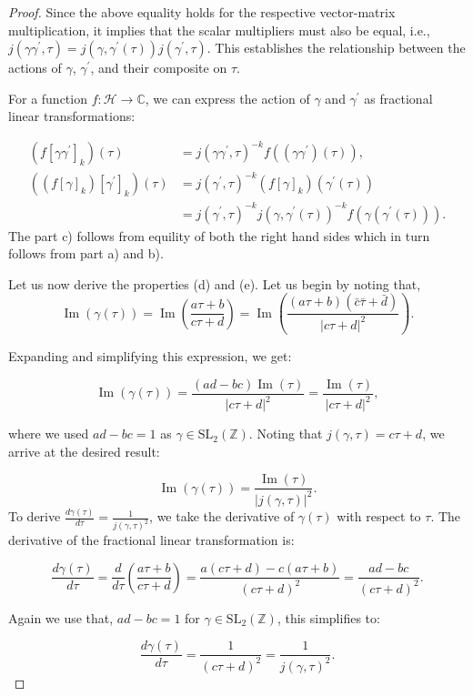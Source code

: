 \begin{proposition}
\begin{proof}
Since the above equality holds for the respective vector-matrix multiplication, it implies that the scalar multipliers must also be equal, i.e., \( j(\gamma \gamma^{\prime}, \tau) = j(\gamma, \gamma^{\prime}(\tau)) j(\gamma^{\prime}, \tau) \). This establishes the relationship between the actions of \( \gamma \), \( \gamma^{\prime} \), and their composite on \( \tau \).

For a function \( f: \mathcal{H} \rightarrow \mathbb{C} \), we can express the action of \( \gamma \) and \( \gamma^{\prime} \) as fractional linear transformations:

\[
\begin{aligned}
\left(f\left[\gamma \gamma^{\prime}\right]_{k}\right)(\tau) &= j(\gamma \gamma^{\prime}, \tau)^{-k} f\left((\gamma \gamma^{\prime})(\tau)\right), \\
\left(\left(f[\gamma]_{k}\right)\left[\gamma^{\prime}\right]_{k}\right)(\tau) &= j(\gamma^{\prime}, \tau)^{-k}\left(f[\gamma]_{k}\right)(\gamma^{\prime}(\tau)) \\
&= j(\gamma^{\prime}, \tau)^{-k} j(\gamma, \gamma^{\prime}(\tau))^{-k} f(\gamma(\gamma^{\prime}(\tau))).
\end{aligned}
\] The part c) follows from equility of both the right hand sides which in turn follows from part a) and b).

Let us now derive the properties (d) and (e).
Let us begin by noting that,
\[
\operatorname{Im}(\gamma(\tau)) = \operatorname{Im}\left(\frac{a\tau + b}{c\tau + d}\right) = \operatorname{Im}\left(\frac{(a\tau + b)(\bar{c}\bar{\tau} + \bar{d})}{|c\tau + d|^2}\right).
\]

Expanding and simplifying this expression, we get:

\[
\operatorname{Im}(\gamma(\tau)) = \frac{(ad - bc)\operatorname{Im}(\tau)}{|c\tau + d|^2} = \frac{\operatorname{Im}(\tau)}{|c\tau + d|^2},
\]

where we used \( ad - bc = 1 \) as \( \gamma \in \mathrm{SL}_{2}(\mathbb{Z}) \). Noting that \( j(\gamma, \tau) = c\tau + d \), we arrive at the desired result:

\[
\operatorname{Im}(\gamma(\tau)) = \frac{\operatorname{Im}(\tau)}{|j(\gamma, \tau)|^{2}}.
\]
To derive \( \frac{d \gamma(\tau)}{d \tau}=\frac{1}{j(\gamma, \tau)^{2}} \), we take the derivative of \( \gamma(\tau) \) with respect to \( \tau \). The derivative of the fractional linear transformation is:

\[
\frac{d \gamma(\tau)}{d \tau} = \frac{d}{d \tau}\left(\frac{a\tau + b}{c\tau + d}\right) = \frac{a(c\tau + d) - c(a\tau + b)}{(c\tau + d)^2} = \frac{ad - bc}{(c\tau + d)^2}.
\]

Again we use that, \( ad - bc = 1 \) for \( \gamma \in \mathrm{SL}_{2}(\mathbb{Z}) \), this simplifies to:

\[
\frac{d \gamma(\tau)}{d \tau} = \frac{1}{(c\tau + d)^2} = \frac{1}{j(\gamma, \tau)^2}.
\]


\end{proof}
\end{proposition}
